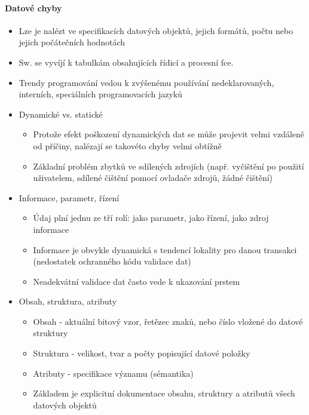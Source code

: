 \paragraph{Datové chyby}
\begin{itemize}[itemsep=0px]
\item Lze je nalézt ve specifikacích datových objektů, jejich formátů, počtu nebo jejich počátečních hodnotách
\item Sw. se vyvíjí k tabulkám obsahujících řídicí a procesní fce.
\item Trendy programování vedou k zvýšenému používání nedeklarovaných, interních, speciálních programovacích jazyků
\item Dynamické vs. statické
    \begin{itemize}[itemsep=0px]
    \item Protože efekt poškození dynamických dat se může projevit velmi vzdáleně od příčiny, nalézají se takovéto chyby velmi obtížně
    \item Základní problém zbytků ve sdílených zdrojích (např. vyčištění po použití uživatelem, sdílené čištění pomocí ovladače zdrojů, žádné čištění)
    \end{itemize}
\item Informace, parametr, řízení
    \begin{itemize}[itemsep=0px]
    \item Údaj plní jednu ze tří rolí: jako parametr, jako řízení, jako zdroj informace
    \item Informace je obvykle dynamická s tendencí lokality pro danou transakci (nedostatek ochranného kódu validace dat)
    \item Neadekvátní validace dat často vede k ukazování prstem
    \end{itemize}
\item Obsah, struktura, atributy
    \begin{itemize}[itemsep=0px]
    \item Obsah - aktuální bitový vzor, řetězec znaků, nebo číslo vložené do datové struktury
    \item Struktura - velikost, tvar a počty popisující datové položky
    \item Atributy - specifikace významu (sémantika)
    \item Základem je explicitní dokumentace obsahu, struktury a atributů všech datových objektů
    \end{itemize}
\end{itemize}

